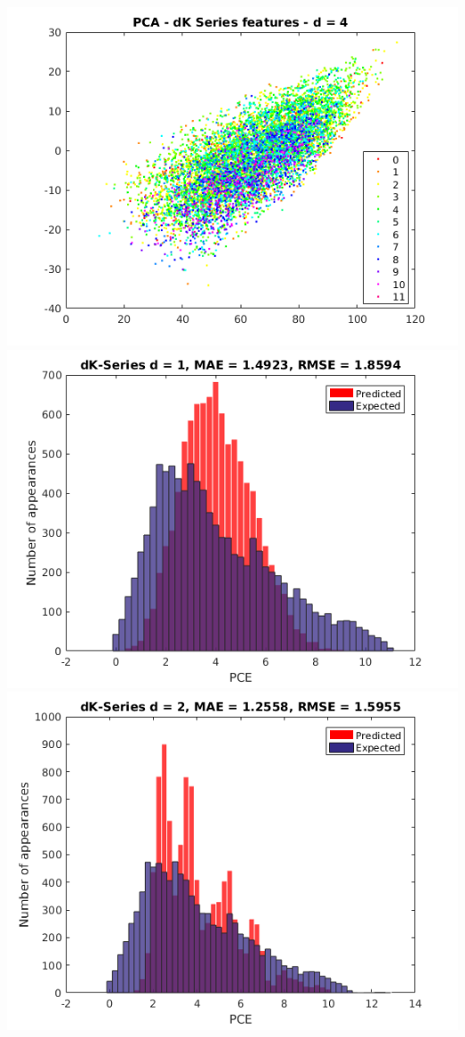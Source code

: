 \documentclass{beamer}
\begin{document}
\begin{frame}
\begin{justify}
\includegraphics[scale=0.2]{d4-PCA} \\
\includegraphics[scale=0.2]{d1}
\includegraphics[scale=0.2]{d2}

\end{justify}
\end{frame}
\end{document}

